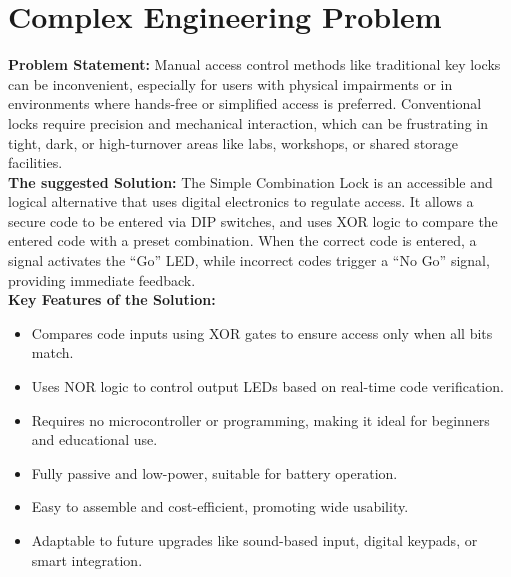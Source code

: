 \section{Complex Engineering Problem}
\textbf{Problem Statement:}
Manual access control methods like traditional key locks can be inconvenient, especially for users with physical impairments or in environments where hands-free or simplified access is preferred. Conventional locks require precision and mechanical interaction, which can be frustrating in tight, dark, or high-turnover areas like labs, workshops, or shared storage facilities.\\
\textbf{The suggested Solution:}
The Simple Combination Lock is an accessible and logical alternative that uses digital electronics to regulate access. It allows a secure code to be entered via DIP switches, and uses XOR logic to compare the entered code with a preset combination. When the correct code is entered, a signal activates the “Go” LED, while incorrect codes trigger a “No Go” signal, providing immediate feedback.\\
\textbf{Key Features of the Solution:}
\begin{itemize}
\item Compares code inputs using XOR gates to ensure access only when all bits match.
\item Uses NOR logic to control output LEDs based on real-time code verification.
\item Requires no microcontroller or programming, making it ideal for beginners and educational use.
\item Fully passive and low-power, suitable for battery operation.
\item Easy to assemble and cost-efficient, promoting wide usability.
\item Adaptable to future upgrades like sound-based input, digital keypads, or smart integration.\cite{4.3}
\end{itemize}

